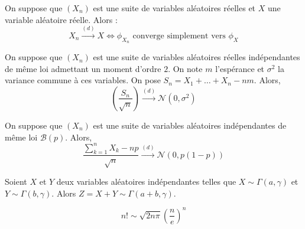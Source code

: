 	
	\begin{theorem}[Lévy]
		On suppose que $(X_n)$ est une suite de variables aléatoires réelles et $X$ une variable aléatoire réelle. Alors :
		\[ X_n \overset{(d)}{\longrightarrow} X \iff \phi_{X_n} \text{ converge simplement vers } \phi_X \]
	\end{theorem}
	
	
	\begin{theorem}
		On suppose que $(X_n)$ est une suite de variables aléatoires réelles indépendantes de même loi admettant un moment d'ordre $2$. On note $m$ l'espérance et $\sigma^2$ la variance commune à ces variables. On pose $S_n = X_1 + \dots + X_n - nm$. Alors,
		\[ \left ( \frac{S_n}{\sqrt{n}} \right) \overset{(d)}{\longrightarrow} \mathcal{N}(0, \sigma^2) \]
	\end{theorem}
	
	\begin{application}
		On suppose que $(X_n)$ est une suite de variables aléatoires indépendantes de même loi $\mathcal{B}(p)$. Alors,
		\[ \frac{\sum_{k=1}^{n} X_k - np}{\sqrt{n}} \overset{(d)}{\longrightarrow} \mathcal{N}(0, p(1-p)) \]
	\end{application}
	
	
	\begin{lemma}
		Soient $X$ et $Y$ deux variables aléatoires indépendantes telles que $X \sim \Gamma(a, \gamma)$ et $Y \sim \Gamma(b, \gamma)$. Alors $Z = X + Y \sim \Gamma(a+b, \gamma)$.
	\end{lemma}
	
	
	\begin{application}
		\[ n! \sim \sqrt{2n\pi} \left(\frac{n}{e} \right)^n \]
	\end{application}

